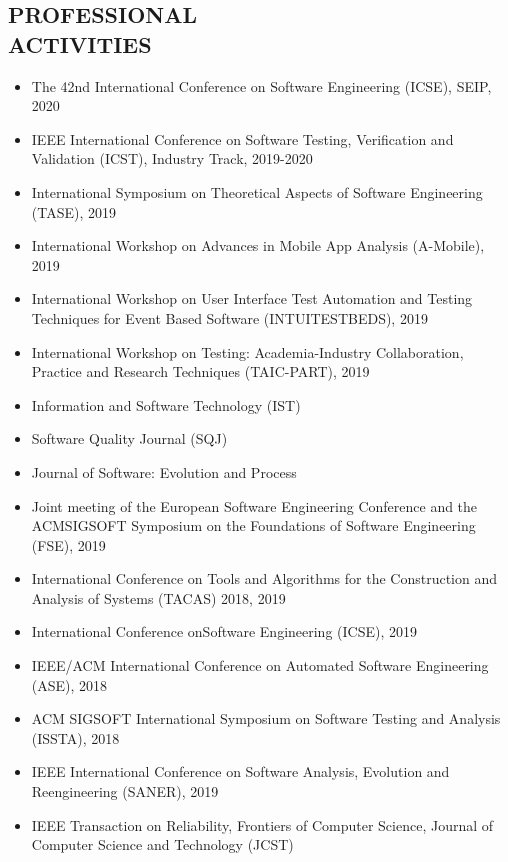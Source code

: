 \documentclass[margin]{res}
\begin{document}
\begin{resume}
\section{PROFESSIONAL\\ACTIVITIES}
\begin{itemize}[leftmargin=*]
	\item The 42nd International Conference on Software Engineering (ICSE), SEIP, 2020
    \item IEEE International Conference on Software Testing, Verification and Validation (ICST), Industry Track, 2019-2020
    \item International Symposium on Theoretical Aspects of Software Engineering (TASE), 2019
    \item International Workshop on Advances in Mobile App Analysis (A-Mobile), 2019
    \item International Workshop on User Interface Test Automation and Testing Techniques for Event Based Software (INTUITESTBEDS), 2019
    \item International Workshop on Testing: Academia-Industry Collaboration, Practice and Research Techniques (TAIC-PART), 2019
\end{itemize}
\begin{itemize}[leftmargin=*]
    \item Information and Software Technology (IST)
    \item Software Quality Journal (SQJ)
    \item Journal of Software: Evolution and Process 
\end{itemize}
\begin{itemize}[leftmargin=*]
    \item Joint meeting of the European Software Engineering Conference and the ACMSIGSOFT Symposium on the Foundations of Software Engineering (FSE), 2019
    \item International Conference on Tools and Algorithms for the Construction and Analysis of Systems (TACAS) 2018, 2019
    \item International Conference onSoftware Engineering (ICSE), 2019
    \item IEEE/ACM  International  Conference  on  Automated  Software  Engineering (ASE), 2018
    \item ACM SIGSOFT International Symposium on Software Testing and Analysis (ISSTA), 2018
    \item IEEE International Conference on Software Analysis, Evolution and Reengineering (SANER), 2019
    \item IEEE Transaction on Reliability, Frontiers of Computer Science, Journal of Computer Science and Technology (JCST)
\end{itemize}


\end{resume}
\end{document}
